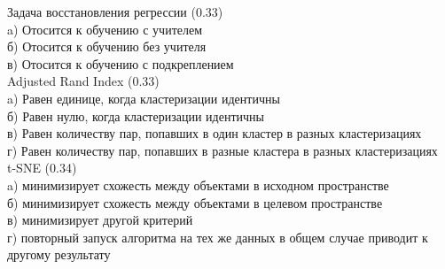 \documentclass[10pt,a4paper]{article}
\begin{document}
\vspace{1em}
\noindent Задача восстановления регрессии (0.33) \\
a) Отосится к обучению с учителем \\
б) Отосится к обучению без учителя \\
в) Отосится к обучению с подкреплением \\

\noindent Adjusted Rand Index (0.33) \\
a) Равен единице, когда кластеризации идентичны \\
б) Равен нулю, когда кластеризации идентичны \\
в) Равен количеству пар, попавших в один кластер в разных кластеризациях \\
г) Равен количеству пар, попавших в разные кластера в разных кластеризациях \\

\noindent t-SNE (0.34) \\
a) минимизирует схожесть между объектами в исходном пространстве \\
б) минимизирует схожесть между объектами в целевом пространстве \\
в) минимизирует другой критерий \\
г) повторный запуск алгоритма на тех же данных в общем случае приводит к другому результату \\
\end{document}
